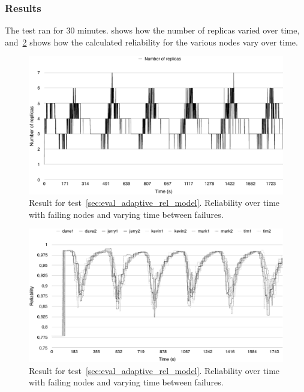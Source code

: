 \documentclass{cslthse-msc}
\begin{document}
\subsubsection*{Results}
The test ran for 30 minutes.  shows how the number of replicas varied over time, and~\cref{fig:eval_self_adaptive_node_rels} shows how the calculated reliability for the various nodes vary over time. 

\begin{figure}[!hbt]
\centering
\includegraphics[scale=0.5]{images/results/self_adaptive_replicas.pdf}
\caption{Result for test~\ref{sec:eval_adaptive_rel_model}. Reliability over time with failing nodes and varying time between failures.} \label{fig:eval_self_adaptive_rel}
\end{figure}

\begin{figure}[!hbt]
\centering
\includegraphics[scale=0.5]{images/results/self_adaptive_node_rels.pdf}
\caption{Result for test~\ref{sec:eval_adaptive_rel_model}. Reliability over time with failing nodes and varying time between failures.} \label{fig:eval_self_adaptive_node_rels}
\end{figure}
\end{document}
